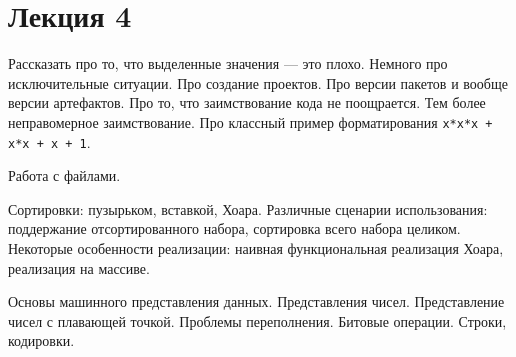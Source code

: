 \section{Лекция 4}
    Рассказать про то, что выделенные значения --- это плохо. Немного про исключительные ситуации.
    Про создание проектов. Про версии пакетов и вообще версии артефактов. Про то, что заимствование кода не поощрается. Тем более неправомерное заимствование. Про классный пример форматирования \verb|x*x*x + x*x + x + 1|.

    Работа с файлами.
    
    Сортировки: пузырьком, вставкой, Хоара. Различные сценарии использования: поддержание отсортированного набора, сортировка всего набора целиком. Некоторые особенности реализации: наивная функциональная реализация Хоара, реализация на массиве.
    
    Основы машинного представления данных. Представления чисел. Представление чисел с плавающей точкой. Проблемы переполнения. Битовые операции. Строки, кодировки.
